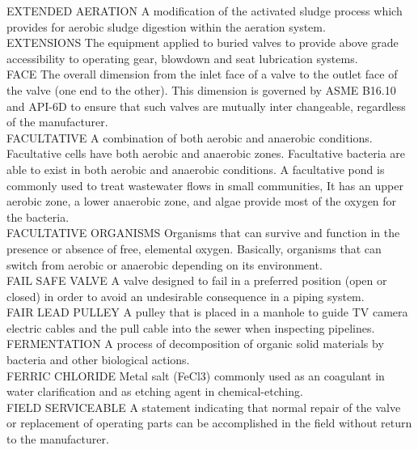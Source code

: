EXTENDED AERATION
A modification of the activated sludge process which provides for aerobic sludge digestion within the aeration system.
\vspace{0.3cm}\\
EXTENSIONS
The equipment applied to buried valves to provide above grade accessibility to operating gear, blowdown and seat lubrication systems.
\vspace{0.3cm}\\
FACE
The overall dimension from the inlet face of a valve to the outlet face of the valve (one end to the other). This dimension is governed by ASME B16.10 and API-6D to ensure that such valves are mutually inter changeable, regardless of the manufacturer.
\vspace{0.3cm}\\
FACULTATIVE
A combination of both aerobic and anaerobic conditions. Facultative cells have both aerobic and anaerobic zones. Facultative bacteria are able to exist in both aerobic and anaerobic conditions. A facultative pond is commonly used to treat wastewater flows in small communities, It has an upper aerobic zone, a lower anaerobic zone, and algae provide most of the oxygen for the bacteria.
\vspace{0.3cm}\\
FACULTATIVE ORGANISMS
Organisms that can survive and function in the presence or absence of free, elemental oxygen. Basically, organisms that can switch from aerobic or anaerobic depending on its environment. 
\vspace{0.3cm}\\
FAIL SAFE VALVE
A valve designed to fail in a preferred position (open or closed) in order to avoid an undesirable consequence in a piping system.
\vspace{0.3cm}\\
FAIR LEAD PULLEY
A pulley that is placed in a manhole to guide TV camera electric cables and the pull cable into the sewer when inspecting pipelines. 
\vspace{0.3cm}\\
FERMENTATION
A process of decomposition of organic solid materials by bacteria and other biological actions.
\vspace{0.3cm}\\
FERRIC CHLORIDE
Metal salt (FeCl3) commonly used as an coagulant in water clarification and as etching agent in chemical-etching.
\vspace{0.3cm}\\
FIELD SERVICEABLE
A statement indicating that normal repair of the valve or replacement of operating parts can be accomplished in the field without return to the manufacturer.
